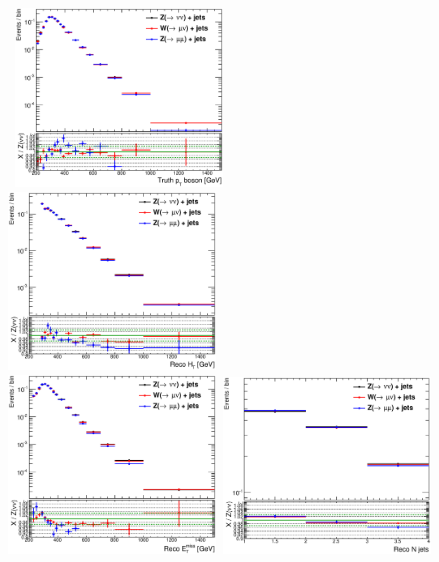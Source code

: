 \begin{figure}
\begin{center}
\mbox{
  \includegraphics[width=0.49\textwidth]{Appendix_ClosureTestZnunu/Figures/compareNormalized_bosonVec_truth_pt_A6_Nom_CRcutsWZ.eps}
  \includegraphics[width=0.49\textwidth]{Appendix_ClosureTestZnunu/Figures/compareNormalized_HT_A6_Nom_CRcutsWZ.eps}
}
\mbox{
  \includegraphics[width=0.49\textwidth]{Appendix_ClosureTestZnunu/Figures/compareNormalized_met_A6_Nom_CRcutsWZ.eps}
  \includegraphics[width=0.49\textwidth]{Appendix_ClosureTestZnunu/Figures/compareNormalized_n_jets_A6_Nom_CRcutsWZ.eps}
}
\end{center}
\end{figure}
